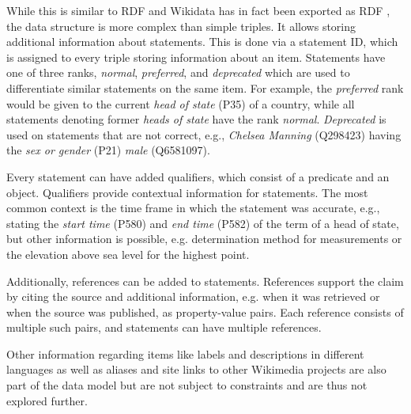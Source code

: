 \documentclass[hyperref,bachelorofscience,fleqn]{cgvpub}
\begin{document}
While this is similar to RDF and Wikidata has in fact been exported as RDF \cite{EGKMV2014}, the data structure is more complex than simple triples. It allows storing additional information about statements. This is done via a statement ID, which is assigned to every triple storing information about an item. Statements have one of three ranks, \emph{normal}, \emph{preferred}, and \emph{deprecated} which are used to differentiate similar statements on the same item. For example, the \emph{preferred} rank would be given to the current \emph{head of state} (P35) of a country, while all statements denoting former \emph{heads of state} have the rank \emph{normal}. \emph{Deprecated} is used on statements that are not correct, e.g., \emph{Chelsea Manning} (Q298423) having the \emph{sex or gender} (P21) \emph{male} (Q6581097).

Every statement can have added qualifiers, which consist of a predicate and an object. Qualifiers provide contextual information for statements. The most common context is the time frame in which the statement was accurate, e.g., stating the \emph{start time} (P580) and \emph{end time} (P582) of the term of a head of state, but other information is possible, e.g. determination method for measurements or the elevation above sea level for the highest point.

Additionally, references can be added to statements. References support the claim by citing the source and additional information, e.g. when it was retrieved or when the source was published, as property-value pairs. Each reference consists of multiple such pairs, and statements can have multiple references.

Other information regarding items like labels and descriptions in different languages as well as aliases and site links to other Wikimedia projects are also part of the data model but are not subject to constraints and are thus not explored further.
\end{document}
